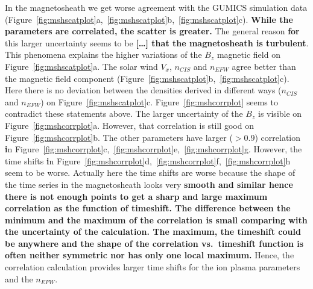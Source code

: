 \documentclass[linenumbers,draft]{agujournal}
\begin{document}
In the magnetosheath we get worse agreement with the GUMICS simulation data (Figure~\ref{fig:mshscatplot}a,~\ref{fig:mshscatplot}b,~\ref{fig:mshscatplot}c). \textbf{While the parameters are correlated, the scatter is greater.} The general reason \textbf{for} this larger uncertainty seems to be \textbf{[\dots] that the magnetosheath is turbulent}. This phenomena explains the higher variations of the $B_{z}$ magnetic field on Figure~\ref{fig:mshscatplot}a. The solar wind $V_{x}$, $n_{CIS}$ and $n_{EFW}$ agree better than the magnetic field component (Figure~\ref{fig:mshscatplot}b,~\ref{fig:mshscatplot}c). Here there is no deviation between the densities derived in different ways ($n_{CIS}$ and $n_{EFW}$) on Figure~\ref{fig:mshscatplot}c. Figure~\ref{fig:mshcorrplot} seems to contradict these statements above. The larger uncertainty of the $B_{z}$ is visible on Figure~\ref{fig:mshcorrplot}a. However, that correlation is still good on Figure~\ref{fig:mshcorrplot}b. The other parameters have larger ($>0.9$) correlation \textbf{i}n Figure~\ref{fig:mshcorrplot}c,~\ref{fig:mshcorrplot}e,~\ref{fig:mshcorrplot}g. However, the time shifts \textbf{i}n Figure~\ref{fig:mshcorrplot}d,~\ref{fig:mshcorrplot}f,~\ref{fig:mshcorrplot}h seem to be worse. Actually here the time shifts are worse because the shape of the time series in the magnetosheath looks very \textbf{smooth and similar hence there is not enough points to get a sharp and large maximum correlation as the function of timeshift. The difference between the minimum and the maximum of the correlation is small comparing with the uncertainty of the calculation. The maximum, the timeshift could be anywhere and the shape of the correlation vs.~timeshift function is often neither symmetric nor has only one local maximum.} Hence, the correlation calculation provides larger time shifts for the ion plasma parameters and the $n_{EFW}$. 
\end{document}

